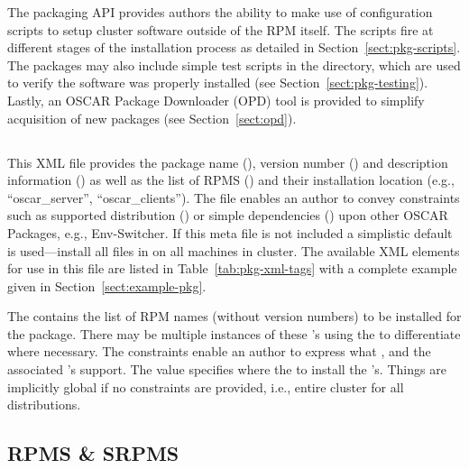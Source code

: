 The packaging API provides authors the ability to make use of configuration
scripts to setup cluster software outside of the RPM itself.  The scripts
fire at different stages of the installation process as detailed in
Section~\ref{sect:pkg-scripts}.  The packages may also include simple test
scripts in the  directory, which are used to verify the
software was properly installed (see Section~\ref{sect:pkg-testing}).
Lastly, an OSCAR Package Downloader (OPD) tool is provided to simplify
acquisition of new packages (see Section~\ref{sect:opd}).




\subsection{}
\label{sect:pkg-config-xml}

This XML file provides the package name (), version number
() and description information () as
well as the list of RPMS () and their installation location
(e.g., ``oscar\_server'', ``oscar\_clients'').   The file enables an author
to convey constraints such as supported distribution () or
simple dependencies () upon other OSCAR Packages, e.g.,
Env-Switcher.  If this meta file is not included a simplistic default is
used---install all files in  on all machines in cluster.
The available XML elements for use in this file are listed in
Table~\ref{tab:pkg-xml-tags} with a complete example given in
Section~\ref{sect:example-pkg}.

The  contains the list of RPM names (without version
numbers) to be installed for the package.  There may be multiple instances
of these 's using the  to differentiate where
necessary.  The  constraints enable an author to express
what ,  and
 the associated 's support.  The 
value specifies where the to install the 's.   Things are
implicitly global if no constraints are provided, i.e., entire cluster for
all distributions.




\subsection{RPMS \& SRPMS}
\label{sect:pkg-rpms-srpms}

